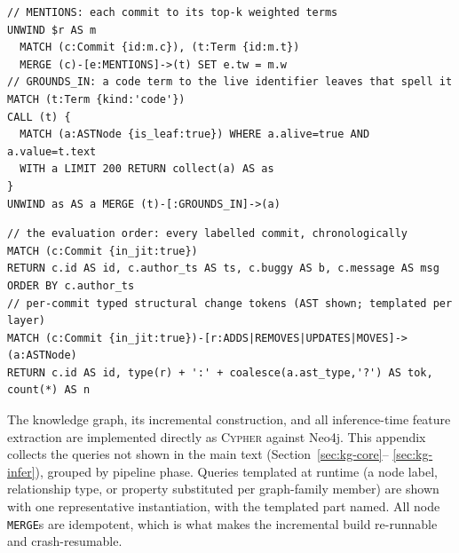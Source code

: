 \documentclass[final,5p,times,twocolumn]{elsarticle}
\theoremstyle{plain}
\begin{document}
\begin{lstlisting}[style=cypher,caption={CSTG tier: commit--term \texttt{MENTIONS} (top-$k$ TW-IDF terms) and the \texttt{GROUNDS\_IN} bridge from code terms to live AST leaves.},label={lst:cstg}]
// MENTIONS: each commit to its top-k weighted terms
UNWIND $r AS m
  MATCH (c:Commit {id:m.c}), (t:Term {id:m.t})
  MERGE (c)-[e:MENTIONS]->(t) SET e.tw = m.w
// GROUNDS_IN: a code term to the live identifier leaves that spell it
MATCH (t:Term {kind:'code'})
CALL (t) {
  MATCH (a:ASTNode {is_leaf:true}) WHERE a.alive=true AND a.value=t.text
  WITH a LIMIT 200 RETURN collect(a) AS as
}
UNWIND as AS a MERGE (t)-[:GROUNDS_IN]->(a)
\end{lstlisting}

\begin{lstlisting}[style=cypher,caption={Inference-time reads: the chronological commit stream and the per-commit structural change-token projection (node label and its type property are templated per graph family member).},label={lst:infer}]
// the evaluation order: every labelled commit, chronologically
MATCH (c:Commit {in_jit:true})
RETURN c.id AS id, c.author_ts AS ts, c.buggy AS b, c.message AS msg
ORDER BY c.author_ts
// per-commit typed structural change tokens (AST shown; templated per layer)
MATCH (c:Commit {in_jit:true})-[r:ADDS|REMOVES|UPDATES|MOVES]->(a:ASTNode)
RETURN c.id AS id, type(r) + ':' + coalesce(a.ast_type,'?') AS tok, count(*) AS n
\end{lstlisting}

The knowledge graph, its incremental construction, and all inference-time feature
extraction are implemented directly as \textsc{Cypher} against Neo4j. This appendix
collects the queries not shown in the main text (Section~\ref{sec:kg-core}--%
\ref{sec:kg-infer}), grouped by pipeline phase. Queries templated at runtime (a node
label, relationship type, or property substituted per graph-family member) are shown
with one representative instantiation, with the templated part named. All node
\lstinline[language=Cypher,basicstyle=\ttfamily\small]!MERGE!s are idempotent, which is
what makes the incremental build re-runnable and crash-resumable.
\end{document}
